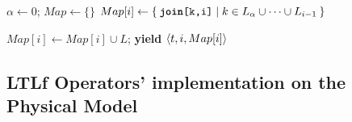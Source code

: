 \begin{algorithm}
{\begin{minipage}{1.3\textwidth}
\begin{algorithmic}[1]
\EndFunction\medskip
\State $\alpha\gets 0$; $Map\gets\{\}$
\State $Map[i]\gets\Set{\texttt{\textbf{join}[k,i]}|k\in L_\alpha\cup\dots\cup L_{i-1}}$
 
\EndIf
\EndWhile
\State $Map[i]\gets Map[i]\cup L$; 
 \textbf{yield} $\braket{t,i,Map[i]}$
\EndFor
\EndFor
\EndFor
\EndFunction\medskip
	\end{algorithmic}
\end{minipage}%
}%
\endgroup
\end{algorithm}
\subsection{LTLf Operators' implementation on the Physical Model}